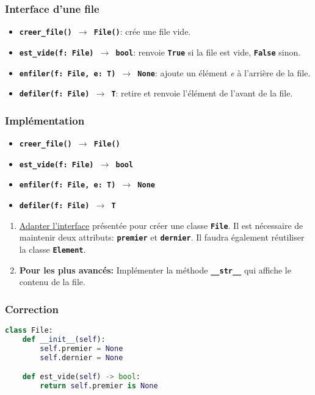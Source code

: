 \documentclass[svgnames,11pt]{beamer}
\begin{document}
\begin{frame}
    \frametitle{Interface d'une file}

    \begin{itemize}
        \item \texttt{\textbf{creer\_file() $\rightarrow$ File()}}: crée une file vide.
        \item \texttt{\textbf{est\_vide(f: File) $\rightarrow$ bool}}: renvoie \textbf{\texttt{True}} si la file est vide, \textbf{\texttt{False}} sinon.
        \item \texttt{\textbf{enfiler(f: File, e: T) $\rightarrow$ None}}: ajoute un élément \emph{e} à l'arrière de la file.
        \item \texttt{\textbf{defiler(f: File) $\rightarrow$ T}}: retire et renvoie l'élément de l'avant de la file.
        \end{itemize}

\end{frame}
\begin{frame}
    \frametitle{Implémentation}

    \begin{itemize}
        \item \texttt{\textbf{creer\_file() $\rightarrow$ File()}}
        \item \texttt{\textbf{est\_vide(f: File) $\rightarrow$ bool}}
        \item \texttt{\textbf{enfiler(f: File, e: T) $\rightarrow$ None}}
        \item \texttt{\textbf{defiler(f: File) $\rightarrow$ T}}
        \end{itemize}

        \begin{activite}
            \begin{enumerate}
                \item \underline{Adapter l'interface} présentée pour créer une classe \textbf{\texttt{File}}. Il est nécessaire de maintenir deux attributs: \textbf{\texttt{premier}} et \textbf{\texttt{dernier}}. Il faudra également réutiliser la classe \textbf{\texttt{Element}}.
                \item \textbf{Pour les plus avancés:} Implémenter la méthode \textbf{\texttt{\_\_str\_\_}} qui affiche le contenu de la file.
            \end{enumerate}
        \end{activite}
\end{frame}
\begin{frame}[fragile]
    \frametitle{Correction}

\begin{lstlisting}[language=Python , basicstyle=\ttfamily\small, xleftmargin=2em, xrightmargin=2em]
class File:
    def __init__(self):
        self.premier = None
        self.dernier = None

    def est_vide(self) -> bool:
        return self.premier is None
\end{lstlisting}

\end{frame}
\end{document}
